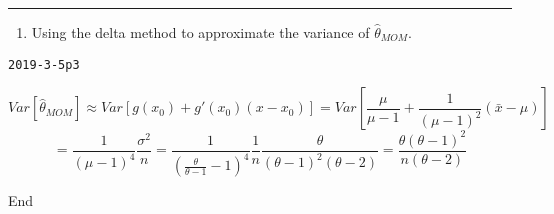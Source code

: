 \documentclass[12pt,]{article}
\newenvironment{Shaded}{\begin{snugshade}}{\end{snugshade}}
\newcommand{\NormalTok}[1]{#1}
\providecommand{\tightlist}{%
  \setlength{\itemsep}{0pt}\setlength{\parskip}{0pt}}
\begin{document}
\begin{center}\rule{0.5\linewidth}{\linethickness}\end{center}

\begin{enumerate}
\def\labelenumi{\alph{enumi}.}
\setcounter{enumi}{2}
\tightlist
\item
  \textcolor[rgb]{0.5,0.5,0.5}{Using the delta method to approximate the variance of $\hat\theta_{MOM}$.}
\end{enumerate}

\texttt{2019-3-5p3}

\[Var[\hat\theta_{MOM}]\approx Var[g(x_0)+g'(x_0)(x-x_0)]=Var[\frac{\mu}{\mu-1}+\frac{1}{(\mu-1)^2}(\bar x-\mu)]\]
\[=\frac{1}{(\mu-1)^4}\frac{\sigma^2}n=\frac{1}{(\frac\theta{\theta-1}-1)^4}\frac1n\frac{\theta}{(\theta-1)^2(\theta-2)}=\frac{\theta(\theta-1)^2}{n(\theta-2)}\]

\begin{Shaded}
\begin{Highlighting}[]
\NormalTok{End}
\end{Highlighting}
\end{Shaded}
\end{document}
